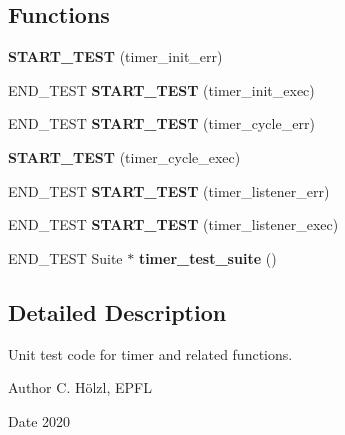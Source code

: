 \subsection*{Functions}
\begin{DoxyCompactItemize}
\item 
\mbox{\label{unit-test-timer_8c_a1e64c5f8604c9a3146324b0fd7e1e757}} 
{\bfseries S\+T\+A\+R\+T\+\_\+\+T\+E\+ST} (timer\+\_\+init\+\_\+err)
\item 
\mbox{\label{unit-test-timer_8c_a15efaa7d4a7aaf43cdf60374c961ed86}} 
E\+N\+D\+\_\+\+T\+E\+ST {\bfseries S\+T\+A\+R\+T\+\_\+\+T\+E\+ST} (timer\+\_\+init\+\_\+exec)
\item 
\mbox{\label{unit-test-timer_8c_ac933fc886c1fea4a4eeeeb36f0bade3d}} 
E\+N\+D\+\_\+\+T\+E\+ST {\bfseries S\+T\+A\+R\+T\+\_\+\+T\+E\+ST} (timer\+\_\+cycle\+\_\+err)
\item 
\mbox{\label{unit-test-timer_8c_a40896d3e24705c9c99fa8ae644a22070}} 
{\bfseries S\+T\+A\+R\+T\+\_\+\+T\+E\+ST} (timer\+\_\+cycle\+\_\+exec)
\item 
\mbox{\label{unit-test-timer_8c_a55321d5c6fe94e1a5ea632483bb9a537}} 
E\+N\+D\+\_\+\+T\+E\+ST {\bfseries S\+T\+A\+R\+T\+\_\+\+T\+E\+ST} (timer\+\_\+listener\+\_\+err)
\item 
\mbox{\label{unit-test-timer_8c_a54e18dcc33450968690632aaa17c43bc}} 
E\+N\+D\+\_\+\+T\+E\+ST {\bfseries S\+T\+A\+R\+T\+\_\+\+T\+E\+ST} (timer\+\_\+listener\+\_\+exec)
\item 
\mbox{\label{unit-test-timer_8c_ac25c76cc4e0dc4c858064c8e9043b78a}} 
E\+N\+D\+\_\+\+T\+E\+ST Suite $\ast$ {\bfseries timer\+\_\+test\+\_\+suite} ()
\end{DoxyCompactItemize}


\subsection{Detailed Description}
Unit test code for timer and related functions. 

\begin{DoxyAuthor}{Author}
C. Hölzl, E\+P\+FL 
\end{DoxyAuthor}
\begin{DoxyDate}{Date}
2020 
\end{DoxyDate}


